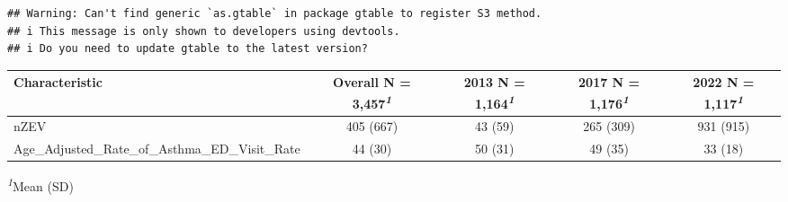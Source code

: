 \documentclass[
]{article}
\begin{document}
\begin{verbatim}
## Warning: Can't find generic `as.gtable` in package gtable to register S3 method.
## i This message is only shown to developers using devtools.
## i Do you need to update gtable to the latest version?
\end{verbatim}

\begin{table}[t]
\fontsize{12.0pt}{14.4pt}\selectfont
\begin{tabular*}{\linewidth}{@{\extracolsep{\fill}}lcccc}
\toprule
\textbf{Characteristic} & \textbf{Overall}  N = 3,457\textsuperscript{\textit{1}} & \textbf{2013}  N = 1,164\textsuperscript{\textit{1}} & \textbf{2017}  N = 1,176\textsuperscript{\textit{1}} & \textbf{2022}  N = 1,117\textsuperscript{\textit{1}} \\ 
\midrule\addlinespace[2.5pt]
nZEV & 405 (667) & 43 (59) & 265 (309) & 931 (915) \\ 
Age\_Adjusted\_Rate\_of\_Asthma\_ED\_Visit\_Rate & 44 (30) & 50 (31) & 49 (35) & 33 (18) \\ 
\bottomrule
\end{tabular*}
\begin{minipage}{\linewidth}
\textsuperscript{\textit{1}}Mean (SD)\\
\end{minipage}
\end{table}
\end{document}
